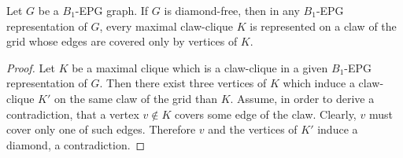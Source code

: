 \documentclass{dmgt}
\begin{document}
\begin{lemma}\label{lem:b1epgDiamondFree}
Let $G$ be a $B_1$-EPG graph. If $G$ is diamond-free, then in any $B_1$-EPG representation of $G$,  every maximal claw-clique $K$ is represented on a claw of the grid whose edges are covered only by vertices of $K$.
\end{lemma}

\begin{proof}Let $K$ be a maximal clique which is a claw-clique in a given $B_1$-EPG representation of $G$. Then there exist three vertices of $K$ which induce a claw-clique $K'$ on
the same claw of the grid than $K$. Assume, in order to derive a contradiction, that a vertex $v\notin K$ covers some edge of the claw. Clearly, $v$ must  cover
only one of such edges. Therefore $v$ and the vertices of $K'$ induce a diamond, a contradiction. 
\end{proof}


\end{document}
